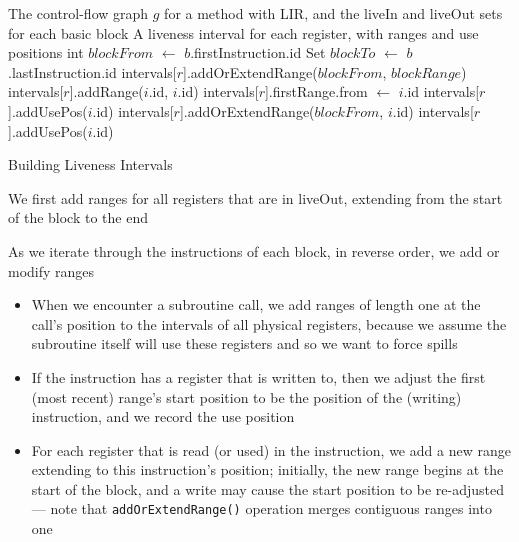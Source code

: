 \documentclass[8pt,a4paper,compress]{beamer}
\begin{document}
\begin{frame}[fragile]
\pause

\begin{algorithm}[H]
\begin{algorithmic}
\REQUIRE The control-flow graph $g$ for a method with LIR, and the liveIn and liveOut sets for each basic block
\ENSURE A liveness interval for each register, with ranges and use positions
    \STATE int $blockFrom$ $\gets$ $b$.firstInstruction.id
    \STATE Set $blockTo$ $\gets$ $b$.lastInstruction.id
        \STATE intervals[$r$].addOrExtendRange($blockFrom$, $blockRange$)
    \ENDFOR
                \STATE intervals[$r$].addRange($i$.id, $i$.id)
            \ENDFOR
        \ENDIF
            \STATE intervals[$r$].firstRange.from $\gets$ $i$.id
            \STATE intervals[$r$].addUsePos($i$.id)
        \ENDFOR
            \STATE intervals[$r$].addOrExtendRange($blockFrom$, $i$.id)
            \STATE intervals[$r$].addUsePos($i$.id)
        \ENDFOR
    \ENDFOR
\ENDFOR
\end{algorithmic}
\caption{Building Liveness Intervals}
\end{algorithm}
\end{frame}

\begin{frame}[fragile]
\pause

We first add ranges for all registers that are in liveOut, extending from the start of the block to the end

\pause
\bigskip

As we iterate through the instructions of each block, in reverse order, we add or modify ranges
\begin{itemize}
\item When we encounter a subroutine call, we add ranges of length one at the call's position to the intervals of all physical registers, because we assume the subroutine itself will use these registers and so we want to force spills

\item If the instruction has a register that is written to, then we adjust the first (most recent) range's start position to be the position of the (writing) instruction, and we record the use position

\item For each register that is read (or used) in the instruction, we add a new range extending to this instruction's position; initially, the new range begins at the start of the block, and a write may cause the start position to be re-adjusted --- note that \lstinline{addOrExtendRange()} operation merges contiguous ranges into one
\end{itemize}
\end{frame}
\end{document}
